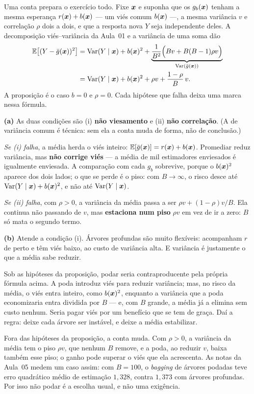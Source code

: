 \begin{solucao}
Uma conta prepara o exercício todo. Fixe $\bm{x}$ e suponha que os $g_b(\bm{x})$ tenham a mesma
esperança $r(\bm{x})+b(\bm{x})$ --- um viés comum $b(\bm{x})$ ---, a mesma variância $v$ e
correlação $\rho$ dois a dois, e que a resposta nova $Y$ seja independente deles. A
decomposição viés--variância da Aula~01 e a variância de uma soma dão
\[
\begin{aligned}
  \mathbb{E}\big[(Y-\bar g(\bm{x}))^2\big]
  &=\operatorname{Var}(Y\mid\bm{x})+b(\bm{x})^2
   +\underbrace{\frac{1}{B^2}\Big(Bv+B(B-1)\rho v\Big)}_{\operatorname{Var}(\bar g(\bm{x}))}\\
  &=\operatorname{Var}(Y\mid\bm{x})+b(\bm{x})^2+\rho v+\frac{1-\rho}{B}\,v .
\end{aligned}
\]
A proposição é o caso $b=0$ e $\rho=0$. Cada hipótese que falha deixa uma marca nessa
fórmula.

\smallskip
\textbf{(a)} As duas condições são (i) \textbf{não viesamento} e (ii) \textbf{não
correlação}. (A de variância comum é técnica: sem ela a conta muda de forma, não de
conclusão.)

\emph{Se (i) falha}, a média herda o viés inteiro: $\mathbb{E}[\bar g(\bm{x})]=r(\bm{x})+b(\bm{x})$.
Promediar reduz variância, mas \textbf{não corrige viés} --- a média de mil estimadores
enviesados é igualmente enviesada. A comparação com cada $g_b$ sobrevive, porque o
$b(\bm{x})^2$ aparece dos dois lados; o que se perde é o piso: com $B\to\infty$, o risco
desce até $\operatorname{Var}(Y\mid\bm{x})+b(\bm{x})^2$, e não até $\operatorname{Var}(Y\mid\bm{x})$.

\emph{Se (ii) falha}, com $\rho>0$, a variância da média passa a ser
$\rho v+(1-\rho)v/B$. Ela continua não passando de $v$, mas \textbf{estaciona num piso}
$\rho v$ em vez de ir a zero: $B$ só mata o segundo termo.

\smallskip
\textbf{(b)} Atende a condição (i). Árvores profundas são muito flexíveis: acompanham
$r$ de perto e têm viés baixo, ao custo de variância alta. E variância é justamente o que
a média sabe reduzir.

Sob as hipóteses da proposição, podar seria contraproducente pela própria fórmula acima.
A poda introduz viés para reduzir variância; mas, no risco da média, o viés entra
inteiro, como $b(\bm{x})^2$, enquanto a variância que a poda economizaria entra dividida por
$B$ --- e, com $B$ grande, a média já a elimina sem custo nenhum. Seria pagar viés por
um benefício que se tem de graça. Daí a regra: deixe cada árvore ser instável, e deixe a
média estabilizar.

Fora das hipóteses da proposição, a conta muda. Com $\rho>0$, a variância da média tem
o piso $\rho v$, que nenhum $B$ remove, e a poda, ao reduzir $v$, baixa também esse piso;
o ganho pode superar o viés que ela acrescenta. As notas da Aula~05 medem um caso
assim: com $B=100$, o \emph{bagging} de árvores podadas teve erro quadrático médio de
estimação $1{,}328$, contra $1{,}373$ com árvores profundas. Por isso não podar é a
escolha usual, e não uma exigência.


\end{solucao}
